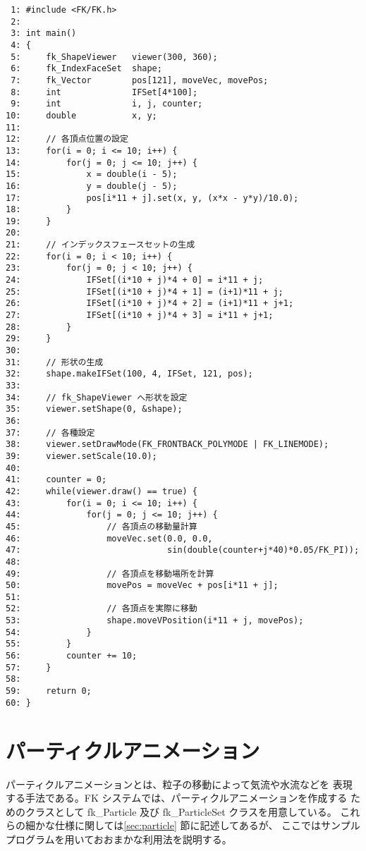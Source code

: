 \begin{breakbox}
\begin{verbatim}
 1: #include <FK/FK.h>
 2: 
 3: int main()
 4: {
 5:     fk_ShapeViewer   viewer(300, 360);
 6:     fk_IndexFaceSet  shape;
 7:     fk_Vector        pos[121], moveVec, movePos;
 8:     int              IFSet[4*100];
 9:     int              i, j, counter;
10:     double           x, y;
11: 
12:     // 各頂点位置の設定
13:     for(i = 0; i <= 10; i++) {
14:         for(j = 0; j <= 10; j++) {
15:             x = double(i - 5);    
16:             y = double(j - 5);
17:             pos[i*11 + j].set(x, y, (x*x - y*y)/10.0);
18:         }
19:     }
20: 
21:     // インデックスフェースセットの生成
22:     for(i = 0; i < 10; i++) {
23:         for(j = 0; j < 10; j++) {
24:             IFSet[(i*10 + j)*4 + 0] = i*11 + j;
25:             IFSet[(i*10 + j)*4 + 1] = (i+1)*11 + j;
26:             IFSet[(i*10 + j)*4 + 2] = (i+1)*11 + j+1;
27:             IFSet[(i*10 + j)*4 + 3] = i*11 + j+1;
28:         }
29:     }
30: 
31:     // 形状の生成
32:     shape.makeIFSet(100, 4, IFSet, 121, pos);
33: 
34:     // fk_ShapeViewer へ形状を設定
35:     viewer.setShape(0, &shape);
36: 
37:     // 各種設定
38:     viewer.setDrawMode(FK_FRONTBACK_POLYMODE | FK_LINEMODE);
39:     viewer.setScale(10.0);
40: 
41:     counter = 0;
42:     while(viewer.draw() == true) {
43:         for(i = 0; i <= 10; i++) {
44:             for(j = 0; j <= 10; j++) {
45:                 // 各頂点の移動量計算
46:                 moveVec.set(0.0, 0.0,
47:                             sin(double(counter+j*40)*0.05/FK_PI));
48: 
49:                 // 各頂点を移動場所を計算
50:                 movePos = moveVec + pos[i*11 + j];
51: 
52:                 // 各頂点を実際に移動
53:                 shape.moveVPosition(i*11 + j, movePos);
54:             }
55:         }
56:         counter += 10;
57:     }
58: 
59:     return 0;
60: }
\end{verbatim}
\end{breakbox}
\section{パーティクルアニメーション}
パーティクルアニメーションとは、粒子の移動によって気流や水流などを
表現する手法である。FK システムでは、パーティクルアニメーションを作成する
ためのクラスとして fk\_Particle 及び fk\_ParticleSet クラスを用意している。
これらの細かな仕様に関しては\ref{sec:particle} 節に記述してあるが、
ここではサンプルプログラムを用いておおまかな利用法を説明する。

